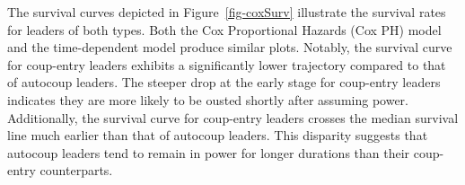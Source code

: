 \documentclass[
  12pt,
]{report}
\begin{document}
The survival curves depicted in Figure~\ref{fig-coxSurv} illustrate the
survival rates for leaders of both types. Both the Cox Proportional
Hazards (Cox PH) model and the time-dependent model produce similar
plots. Notably, the survival curve for coup-entry leaders exhibits a
significantly lower trajectory compared to that of autocoup leaders. The
steeper drop at the early stage for coup-entry leaders indicates they
are more likely to be ousted shortly after assuming power. Additionally,
the survival curve for coup-entry leaders crosses the median survival
line much earlier than that of autocoup leaders. This disparity suggests
that autocoup leaders tend to remain in power for longer durations than
their coup-entry counterparts.

\begin{figure}

\begin{minipage}{0.50\linewidth}



\end{minipage}%
%
\begin{minipage}{0.50\linewidth}

\end{minipage}
\end{figure}
\end{document}
